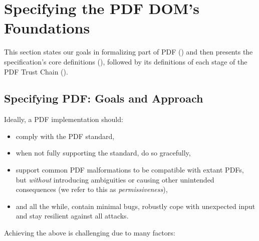 \section{Specifying the PDF DOM's Foundations}
\label{sec:specifying}

This section %
states our goals in formalizing part of PDF
() and then presents the specification's core
definitions (), followed by its definitions of each
stage of the PDF Trust Chain ().

\subsection{Specifying PDF: Goals and Approach}
\label{sec:spec-goals}

Ideally, a PDF implementation should:
\begin{itemize}
\item comply with the PDF standard,
\item when not fully supporting the standard, do so gracefully,
\item support common PDF malformations
  to be compatible with extant PDFs, but \emph{without} introducing ambiguities
  or causing other unintended consequences (we refer to this as \emph{permissiveness}),
\item and all the while, contain minimal bugs, robustly cope with unexpected input and stay resilient
  against all attacks.
\end{itemize}
Achieving the above is challenging due to many factors:
